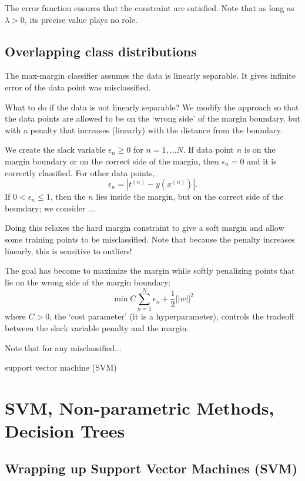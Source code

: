 \documentclass[a4paper,12pt]{article}
\begin{document}
The error function ensures that the constraint are satisfied. Note that as long as $\lambda>0$, its precise value plays no role. 


\subsection{Overlapping class distributions}

The max-margin classifier assumes the data is linearly separable. It gives infinite error of the data point was misclassified. 

What to do if the data is not linearly separable? We modify the approach so that the data points are allowed to be on the `wrong side' of the margin boundary, but with a penalty that increases (linearly) with the distance from the boundary. 

We create the slack variable $\epsilon_n \geq 0$ for $n=1,...N$. If data point $n$ is on the margin boundary or on the correct side of the margin, then $\epsilon_n = 0$ and it is correctly classified. For other data points, 
$$\epsilon_n = |t^{(n)} - y(x^{(n)})|.$$
If $0 < \epsilon_n \leq 1$, then the $n$ lies inside the margin, but on the correct side of the boundary; we consider ...

Doing this relaxes the hard margin constraint to give a soft margin and allow some training points to be misclassified. Note that because the penalty increases linearly, this is sensitive to outliers! 

The goal has become to maximize the margin while softly penalizing points that lie on the wrong side of the margin boundary: 
$$\min C \sum_{n=1}^N \epsilon_n + \frac{1}{2}||w||^2$$
where $C>0$, the `cost parameter' (it is a hyperparameter), controls the tradeoff between the slack variable penalty and the margin. 

Note that for any misclassified...

support vector machine (SVM)

\clearpage

\section{SVM, Non-parametric Methods, Decision Trees}

\subsection{Wrapping up Support Vector Machines (SVM)}
\end{document}
